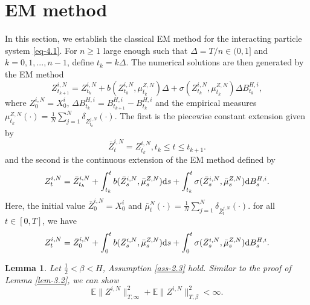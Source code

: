 \documentclass[12pt]{article}
\newtheorem{lemma}[theorem]{Lemma}
\def\d{\text{\rm{d}}}
\def\E{\mathbb E}
\numberwithin{equation}{section}
\begin{document}
\section{EM method}
In this section, we establish the classical EM method for the interacting particle system \eqref{eq-4.1}. For $n\geq 1$ large enough such that $\Delta=T/n\in (0,1]$ and $k=0,1, ..., n-1$, define $t_k=k\Delta$. The numerical solutions are then generated by the EM method
\begin{equation}
	Z_{t_{k+1}}^{i,N}=Z_{t_k}^{i,N}+b(Z_{t_k}^{i,N},\mu_{t_k}^{Z,N})\Delta+\sigma(Z_{t_k}^{i,N},\mu_{t_k}^{Z,N})\Delta B^{H,i}_{t_k},
\end{equation}
where $Z^{i,N}_0=X^{i}_0$, $\Delta B^{H,i}_{t_k}=B^{H,i}_{t_{k+1}}-B^{H,i}_{t_k}$ and the empirical measures $\mu_{t_k}^{Z,N}(\cdot)=\frac{1}{N}\sum_{j=1}^{N}\delta_{Z_{t_k}^{j,N}}(\cdot)$. The first is the piecewise constant extension given by
\begin{equation}
	\bar{Z}_t^{i,N}=Z_{t_k}^{i,N}, t_k\leq t \leq t_{k+1}.
\end{equation}
and the second is the continuous extension of the EM method defined by
\begin{equation}\label{eq-5.3}
	Z_{t}^{i,N}=\bar Z_{t_k}^{i,N}+\int_{t_k}^{t}b(\bar Z_{s}^{i,N},\bar \mu_{s}^{Z,N})\d s+\int_{t_k}^{t}\sigma(\bar Z_{s}^{i,N},\bar \mu_{s}^{Z,N})\d B^{H,i}_{s}.
\end{equation}
Here, the initial value $\bar{Z}_0^{i,N}=X^{i}_0$ and $\bar \mu_{t}^N(\cdot)=\frac{1}{N}\sum_{j=1}^{N}\delta_{\bar Z_{t}^{j,N}}(\cdot)$. for all $t \in [0, T ]$, we have
\begin{equation}\label{eq-5.4}
	Z_{t}^{i,N}=\bar Z_{0}^{i,N}+\int_{0}^{t}b(\bar Z_{s}^{i,N},\bar \mu_{s}^{Z,N})\d s+\int_{0}^{t}\sigma(\bar Z_{s}^{i,N},\bar \mu_{s}^{Z,N})\d B^{H,i}_{s}.
\end{equation}

\begin{lemma}\label{lem-4.1}
	Let $\frac{1}{2}<\beta<H$, Assumption \ref{ass-2.3} hold. Similar to the proof of Lemma \ref{lem-3.2}, we can show
	\begin{equation}
		\E\|Z^{i,N}\|^2_{T,\infty}+\E\|Z^{i,N}\|^2_{T,\beta}< \infty.
	\end{equation}
\end{lemma}
\end{document}
